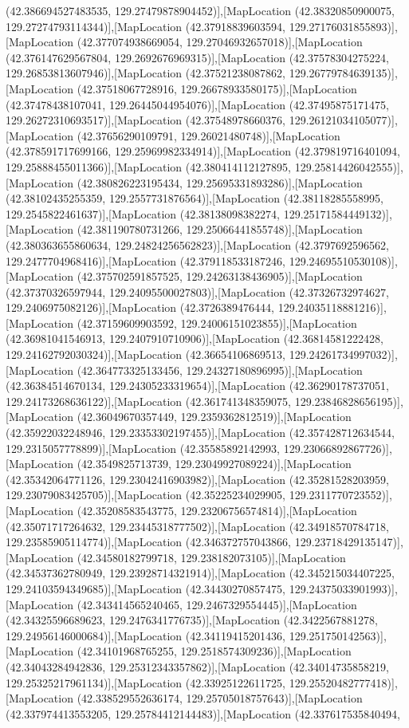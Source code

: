 (42.386694527483535, 129.27479878904452)],[MapLocation (42.38320850900075, 129.27274793114344)],[MapLocation (42.37918839603594, 129.27176031855893)],[MapLocation (42.377074938669054, 129.27046932657018)],[MapLocation (42.376147629567804, 129.2692676969315)],[MapLocation (42.37578304275224, 129.26853813607946)],[MapLocation (42.37521238087862, 129.26779784639135)],[MapLocation (42.37518067728916, 129.26678933580175)],[MapLocation (42.37478438107041, 129.26445044954076)],[MapLocation (42.37495875171475, 129.26272310693517)],[MapLocation (42.37548978660376, 129.26121034105077)],[MapLocation (42.37656290109791, 129.26021480748)],[MapLocation (42.378591717699166, 129.25969982334914)],[MapLocation (42.379819716401094, 129.25888455011366)],[MapLocation (42.380414112127895, 129.25814426042555)],[MapLocation (42.380826223195434, 129.25695331893286)],[MapLocation (42.38102435255359, 129.2557731876564)],[MapLocation (42.38118285558995, 129.2545822461637)],[MapLocation (42.38138098382274, 129.25171584449132)],[MapLocation (42.381190780731266, 129.25066441855748)],[MapLocation (42.380363655860634, 129.24824256562823)],[MapLocation (42.3797692596562, 129.2477704968416)],[MapLocation (42.379118533187246, 129.24695510530108)],[MapLocation (42.375702591857525, 129.24263138436905)],[MapLocation (42.37370326597944, 129.24095500027803)],[MapLocation (42.37326732974627, 129.2406975082126)],[MapLocation (42.3726389476444, 129.24035118881216)],[MapLocation (42.37159609903592, 129.24006151023855)],[MapLocation (42.36981041546913, 129.2407910710906)],[MapLocation (42.36814581222428, 129.24162792030324)],[MapLocation (42.36654106869513, 129.24261734997032)],[MapLocation (42.364773325133456, 129.24327180896995)],[MapLocation (42.36384514670134, 129.24305233319654)],[MapLocation (42.36290178737051, 129.24173268636122)],[MapLocation (42.361741348359075, 129.23846828656195)],[MapLocation (42.36049670357449, 129.2359362812519)],[MapLocation (42.35922032248946, 129.23353302197455)],[MapLocation (42.357428712634544, 129.2315057778899)],[MapLocation (42.35585892142993, 129.23066892867726)],[MapLocation (42.3549825713739, 129.23049927089224)],[MapLocation (42.35342064771126, 129.23042416903982)],[MapLocation (42.35281528203959, 129.23079083425705)],[MapLocation (42.35225234029905, 129.2311770723552)],[MapLocation (42.35208583543775, 129.23206756574814)],[MapLocation (42.35071717264632, 129.23445318777502)],[MapLocation (42.34918570784718, 129.23585905114774)],[MapLocation (42.346372757043866, 129.23718429135147)],[MapLocation (42.34580182799718, 129.238182073105)],[MapLocation (42.34537362780949, 129.23928714321914)],[MapLocation (42.345215034407225, 129.24103594349685)],[MapLocation (42.34430270857475, 129.24375033901993)],[MapLocation (42.343414565240465, 129.2467329554445)],[MapLocation (42.34325596689623, 129.2476341776735)],[MapLocation (42.3422567881278, 129.24956146000684)],[MapLocation (42.34119415201436, 129.251750142563)],[MapLocation (42.34101968765255, 129.2518574309236)],[MapLocation (42.34043284942836, 129.25312343357862)],[MapLocation (42.34014735858219, 129.25325217961134)],[MapLocation (42.33925122611725, 129.25520482777418)],[MapLocation (42.338529552636174, 129.25705018757643)],[MapLocation (42.337974413553205, 129.25784412144483)],[MapLocation (42.337617535840494, 